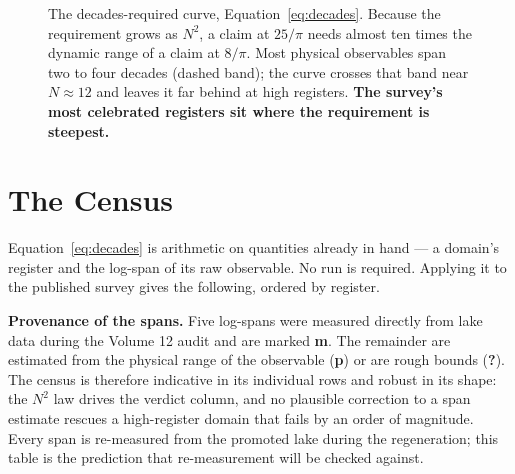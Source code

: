 \documentclass[11pt, letterpaper, openany]{book}
\begin{document}
\begin{figure}[H]
\centering
{}
\caption{The decades-required curve, Equation~\ref{eq:decades}. Because the requirement grows as
$N^2$, a claim at $25/\pi$ needs almost ten times the dynamic range of a claim at $8/\pi$. Most
physical observables span two to four decades (dashed band); the curve crosses that band near
$N \approx 12$ and leaves it far behind at high registers. \textbf{The survey's most celebrated
registers sit where the requirement is steepest.}}
\end{figure}

\section{The Census}

Equation~\ref{eq:decades} is arithmetic on quantities already in hand --- a domain's register
and the log-span of its raw observable. No run is required. Applying it to the published survey
gives the following, ordered by register.

\begin{warningbox}
\textbf{Provenance of the spans.} Five log-spans were measured directly from lake data during
the Volume 12 audit and are marked \textbf{m}. The remainder are estimated from the physical
range of the observable (\textbf{p}) or are rough bounds (\textbf{?}). The census is therefore
indicative in its individual rows and robust in its shape: the $N^2$ law drives the verdict
column, and no plausible correction to a span estimate rescues a high-register domain that
fails by an order of magnitude. Every span is re-measured from the promoted lake during the
regeneration; this table is the prediction that re-measurement will be checked against.
\end{warningbox}
\end{document}
